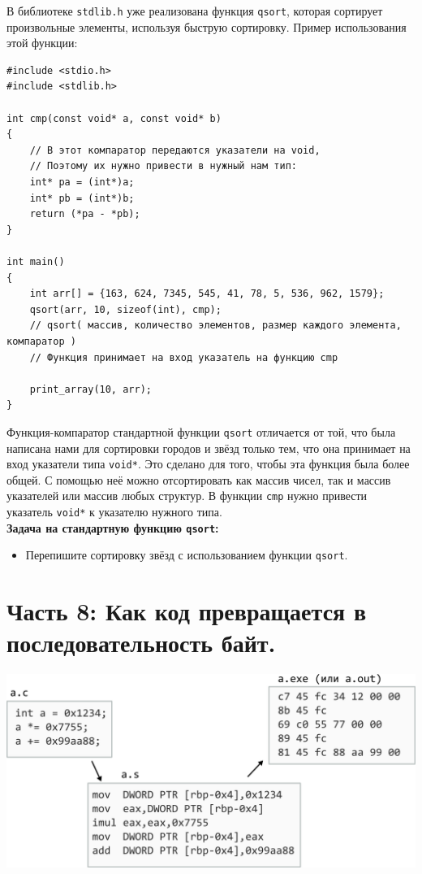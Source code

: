 \documentclass{article}
\begin{document}
В библиотеке \texttt{stdlib.h} уже реализована функция \texttt{qsort}, которая сортирует произвольные элементы, используя быструю сортировку. Пример использования этой функции:
\begin{lstlisting}
#include <stdio.h>
#include <stdlib.h>

int cmp(const void* a, const void* b)
{
    // В этот компаратор передаются указатели на void,
    // Поэтому их нужно привести в нужный нам тип:
    int* pa = (int*)a;
    int* pb = (int*)b;
    return (*pa - *pb);
}

int main()
{
    int arr[] = {163, 624, 7345, 545, 41, 78, 5, 536, 962, 1579};
    qsort(arr, 10, sizeof(int), cmp);
    // qsort( массив, количество элементов, размер каждого элемента, компаратор )
    // Функция принимает на вход указатель на функцию cmp
   
    print_array(10, arr);
}
\end{lstlisting}
Функция-компаратор стандартной функции \texttt{qsort} отличается от той, что была написана нами для сортировки
городов и звёзд только тем, что она принимает на вход указатели типа \texttt{void*}. Это сделано для того, чтобы эта функция была более общей. С помощью неё можно отсортировать как массив чисел, так и массив указателей или массив любых структур. В функции \texttt{cmp} нужно привести указатель \texttt{void*} к указателю нужного типа.\\
\textbf{Задача на стандартную функцию \texttt{qsort}:}
\begin{itemize}
\item Перепишите сортировку звёзд с использованием функции \texttt{qsort}.
\end{itemize}



\newpage
\section*{Часть 8: Как код превращается в последовательность байт.}
\begin{center}
\includegraphics[scale=0.9]{../images/code_to_hex.png}
\end{center}
\end{document}
